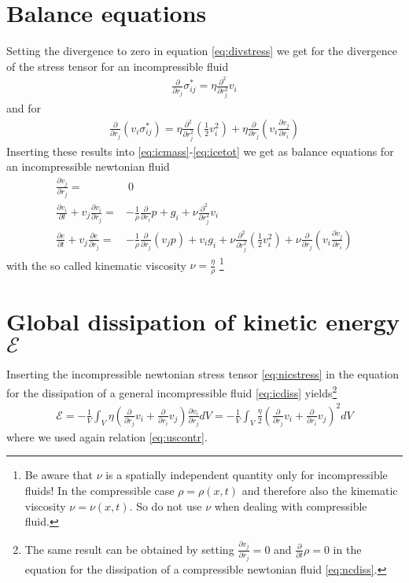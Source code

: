 \documentclass[a4paper,
					12pt,
					twoside,
					openright
					]{book}
\newcommand{\lra}[1]{{ \left( #1 \right) }}
\newcommand{\pd}[1]{\frac{\partial}{\partial #1}}
\newcommand{\ppd}[2]{\frac{\partial #2}{\partial #1}}
\newcommand{\pdd}[1]{\frac{\partial^2}{\partial #1^2}}
\begin{document}
\section{Balance equations}
Setting the divergence to zero in equation \ref{eq:divstress} we get for
the divergence of the stress tensor for an incompressible fluid
\begin{align}
\pd{r_j} \sigma^*_{ij} =\eta \pdd{r_j}v_i \label{eq:nicdivstress}
\end{align}
and for
\begin{align}
\pd{r_j}(v_i \sigma^*_{ij})
=\eta \pdd{r_j}\lra{\frac{1}{2}v_i^2}+\eta\pd{r_j}\lra{v_i\ppd{r_i}{v_j}}
\end{align}
Inserting these results into \eqref{eq:icmass}-\eqref{eq:icetot} we get
as balance equations for an incompressible newtonian fluid
\begin{align}
\ppd{r_j}{v_j} =&\ 0\\
\ppd{t}{v_i} + v_j \ppd{r_j}{v_i} =& -\frac{1}{\rho}\pd{r_i}p + g_i
+\nu\pdd{r_j}v_i\\
\ppd{t}{e} + v_j \ppd{r_j}{e} =& -\frac{1}{\rho} \pd{r_j}(v_j p) + v_i g_i
+\nu \pdd{r_j}\lra{\frac{1}{2}v_i^2}+ \nu \pd{r_j}\lra{v_i\ppd{r_i}{v_j}}
\end{align}
with the so called kinematic viscosity $\nu=\frac{\eta}{\rho}$
\footnote{Be aware that $\nu$ is a spatially independent quantity only 
for incompressible fluids! In the compressible case $\rho=\rho(x,t)$ and
therefore also the kinematic viscosity $\nu=\nu(x,t)$. So do not use $\nu$
when dealing with compressible fluid.}

\section{Global dissipation of kinetic energy $\mathcal{E}$}\label{nicdiss}
Inserting the incompressible newtonian stress tensor \eqref{eq:nicstress} 
in the equation for the dissipation of a general incompressible fluid
\ref{eq:icdiss} yields\footnote{The same result can be
obtained by setting $\ppd{r_j}{v_j}=0$ and $\pd{t}\rho=0$ in the equation for
the dissipation of a compressible newtonian fluid \eqref{eq:ncdiss}.}
\begin{align}
\mathcal{E} 
=-\frac{1}{V} \int_V  \eta\lra{\pd{r_j}v_i+\pd{r_i}v_j}\ppd{r_j}{v_i} dV
=-\frac{1}{V} \int_V \frac{\eta}{2}\lra{\pd{r_j}v_i+\pd{r_i}v_j}^2 dV
\end{align}
where we used again relation \ref{eq:uscontr}.
\end{document}
